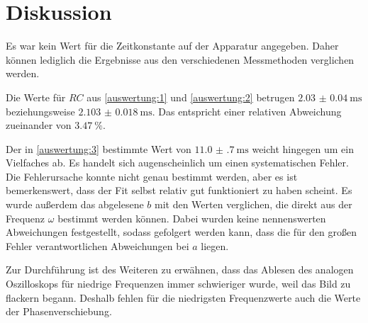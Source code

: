 \section{Diskussion}
\label{sec:diskussion}

Es war kein Wert für die Zeitkonstante auf der Apparatur angegeben.
Daher können lediglich die Ergebnisse aus den verschiedenen Messmethoden verglichen werden.


Die Werte für $RC$ aus \autoref{auswertung:1} und \autoref{auswertung:2} betrugen
$\SI{2.03(4)}{\milli\second}$ beziehungsweise $\SI{2.103(18)}{\milli\second}$.
Das entspricht einer relativen Abweichung zueinander von $\SI{3.47}{\percent}$.

Der in \autoref{auswertung:3} bestimmte Wert von $\SI{11.0(7)}{\milli\second}$
weicht hingegen um ein Vielfaches ab.
Es handelt sich augenscheinlich um einen systematischen Fehler.
Die Fehlerursache konnte nicht genau bestimmt werden,
aber es ist bemerkenswert,
dass der Fit selbst relativ gut funktioniert zu haben scheint.
Es wurde außerdem das abgelesene $b$ mit den Werten verglichen,
die direkt aus der Frequenz $\omega$ bestimmt werden können.
Dabei wurden keine nennenswerten Abweichungen festgestellt,
sodass gefolgert werden kann,
dass die für den großen Fehler verantwortlichen Abweichungen bei $a$ liegen.

Zur Durchführung ist des Weiteren zu erwähnen,
dass das Ablesen des analogen Oszilloskops für niedrige Frequenzen immer schwieriger wurde,
weil das Bild zu flackern begann.
Deshalb fehlen für die niedrigsten Frequenzwerte auch die Werte der Phasenverschiebung.

